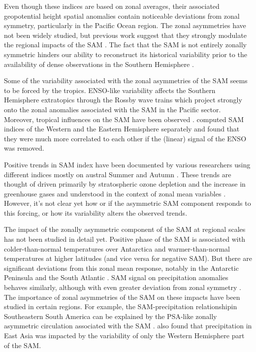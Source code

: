 \documentclass[smallextended]{svjour3}       %
\begin{document}
Even though these indices are based on zonal averages, their associated geopotential height spatial anomalies contain noticeable deviations from zonal symmetry, particularly in the Pacific Ocean region. The zonal asymmetries have not been widely studied, but previous work suggest that they strongly modulate the regional impacts of the SAM \citep{fan2007, silvestri2009, fogt2012, rosso2018}. The fact that the SAM is not entirely zonally symmetric hinders our ability to reconstruct its historical variability prior to the availability of dense observations in the Southern Hemisphere \citep{jones2009}.

Some of the variability associated with the zonal asymmetries of the SAM seems to be forced by the tropics. ENSO-like variability affects the Southern Hemisphere extratopics through the Rossby wave trains \citep{mo1987, kidson1988, karoly1989} which project strongly onto the zonal anomalies associated with the SAM in the Pacific sector. Moreover, tropical influences on the SAM have been observed \citep{fan2007, fogt2011, clem2013}. \citet{fan2007} computed SAM indices of the Western and the Eastern Hemisphere separately and found that they were much more correlated to each other if the (linear) signal of the ENSO was removed.

Positive trends in SAM index have been documented by various researchers using different indices mostly on austral Summer and Autumn \citep[e.g.][ and references therein]{fogt2020}. These trends are thought of driven primarily by stratospheric ozone depletion and the increase in greenhouse gases and understood in the context of zonal mean variables \citep{marshall2004, gillett2005, arblaster2006, gillett2013}. However, it's not clear yet how or if the asymmetric SAM component responds to this forcing, or how its variability alters the observed trends.

The impact of the zonally asymmetric component of the SAM at regional scales has not been studied in detail yet. Positive phase of the SAM is associated with colder-than-normal temperatures over Antarctica and warmer-than-normal temperatures at higher latitudes \citep{jones2019} (and vice versa for negative SAM). But there are significant deviations from this zonal mean response, notably in the Antarctic Peninsula and the South Atlantic \citep{fogt2012}. SAM signal on precipitation anomalies behaves similarly, although with even greater deviation from zonal symmetry \citep{lim2016}. The importance of zonal asymmetries of the SAM on these impacts have been studied in certain regions. For example, the SAM-precipitation relationshipin Southeastern South America can be explained by the PSA-like zonally asymmetric circulation associated with the SAM \citep{silvestri2009, rosso2018}. \citet{fan2007} also found that precipitation in East Asia was impacted by the variability of only the Western Hemisphere part of the SAM.
\end{document}
